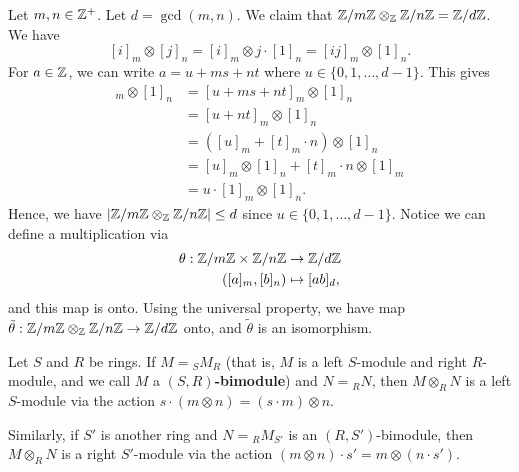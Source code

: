 \begin{exmp}{}
    Let $m, n \in \mathbb{Z}^+$. Let $d = \gcd(m, n)$. We claim that 
    $\mathbb{Z}/m\mathbb{Z} \otimes_{\mathbb{Z}} \mathbb{Z}/n\mathbb{Z} = \mathbb{Z}/d\mathbb{Z}$. We have 
    \[ [i]_m \otimes [j]_n = [i]_m \otimes j \cdot [1]_n 
    = [ij]_m \otimes [1]_n. \] 
    For $a \in \mathbb{Z}$, we can write $a = u + ms + nt$ where 
    $u \in \{0, 1, \dots, d-1\}$. This gives 
    \begin{align*} 
        [ij]_m \otimes [1]_n 
        &= [u + ms + nt]_m \otimes [1]_n \\
        &= [u + nt]_m \otimes [1]_n \\
        &= ([u]_m + [t]_m \cdot n) \otimes [1]_n \\
        &= [u]_m \otimes [1]_n + [t]_m \cdot n \otimes [1]_m \\
        &= u \cdot [1]_m \otimes [1]_n. 
    \end{align*}
    Hence, we have $|\mathbb{Z}/m\mathbb{Z} \otimes_{\mathbb{Z}} \mathbb{Z}/n\mathbb{Z}| \leq d$ since 
    $u \in \{0, 1, \dots, d-1\}$. 
    Notice we can define a multiplication via 
    \begin{align*}
        \theta : \mathbb{Z}/m\mathbb{Z} \times \mathbb{Z}/n\mathbb{Z} &\to \mathbb{Z}/d\mathbb{Z} \\ 
        ([a]_m, [b]_n) &\mapsto [ab]_d, 
    \end{align*}
    and this map is onto. Using the universal property, we have 
    map $\tilde\theta : \mathbb{Z}/m\mathbb{Z} \otimes_{\mathbb{Z}} \mathbb{Z}/n\mathbb{Z} \to \mathbb{Z}/d\mathbb{Z}$ 
    onto, and $\tilde\theta$ is an isomorphism. 
    \begin{center}
    \end{center}
\end{exmp}

\begin{remark}{}
    Let $S$ and $R$ be rings. If $M = {}_S M_R$ (that is, $M$ is a 
    left $S$-module and right $R$-module, and we call $M$ a 
    \textbf{$(S, R)$-bimodule}) and $N = {}_R N$, then 
    $M \otimes_R N$ is a left $S$-module via the action
    $s \cdot (m \otimes n) = (s \cdot m) \otimes n$. 
    
    Similarly, if $S'$ is another ring and $N = {}_R M_{S'}$ is an 
    $(R, S')$-bimodule, then $M \otimes_R N$ is a right $S'$-module via the 
    action $(m \otimes n) \cdot s' = m \otimes (n \cdot s')$. 
\end{remark}

